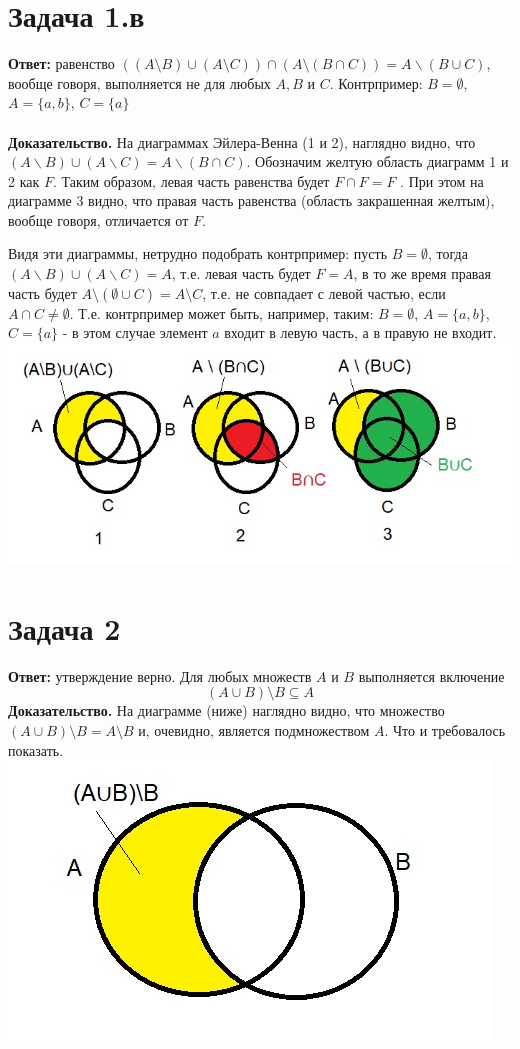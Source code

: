 \documentclass{article}
\begin{document}
\section*{Задача 1.в}
{\bf Ответ:} равенство $((A \setminus B) \cup(A \setminus C)) \cap(A \setminus(B \cap C))=A \backslash(B \cup C)$, вообще говоря, выполняется не для любых $A,B$ и $C$. Контрпример: $B = \emptyset$, $A=\{a,b\}$, $C=\{a\}$
\\
\\
{\bf Доказательство.} На диаграммах Эйлера-Венна (1 и 2), наглядно видно, что  $(A \backslash B) \cup(A \backslash C) = A \backslash(B \cap C)$. Обозначим желтую область диаграмм 1 и 2 как $F$. Таким образом, левая часть равенства будет $F\cap F = F$ . При этом на диаграмме 3 видно, что правая часть равенства (область закрашенная желтым), вообще говоря, отличается от $F$.
\par
Видя эти диаграммы, нетрудно подобрать контрпример: пусть $B=\emptyset$, тогда $(A \backslash B) \cup(A \backslash C) = A $, т.е. левая часть будет $F = A$, в то же время  правая часть будет $A \setminus(\emptyset \cup C) = A \setminus C$, т.е. не совпадает с левой частью, если $A\cap C \neq \emptyset$. Т.е. контрпример может быть, например, таким: $B = \emptyset$, $A=\{a,b\}$, $C=\{a\}$ - в этом случае элемент $a$ входит в левую часть, а в правую не входит.
\\
{\includegraphics[scale=0.8]{img/img3.jpg}}
\section*{Задача 2}
{\bf Ответ:} утверждение верно. Для любых множеств $A$ и $B$ выполняется включение
$$(A\cup B)\setminus B \subseteq A$$
{\bf Доказательство.} На диаграмме (ниже) наглядно видно, что множество $(A\cup B)\setminus B = A\setminus B$ и, очевидно, является подмножеством $A$. Что и требовалось показать.
\\
{\includegraphics[scale=0.8]{img/img4.jpg}}
\end{document}
